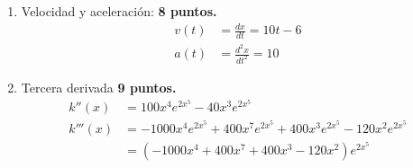 \documentclass{article}
\begin{document}
\begin{enumerate}
\item Velocidad y aceleración:
\hfill \textbf{8 puntos.}
\begin{align*}
v(t) &= \frac{dx}{dt} = 10t -6 \\
a(t) &= \frac{d^2x}{dt^2} = 10
\end{align*}

\item Tercera derivada
\hfill \textbf{9 puntos.}
\begin{align*}
k''(x)  &= 100x^{4} e^{2x^{5}} -40x^3 e^{2x^{5}} \\
k'''(x) &= -1000x^{4} e^{2x^{5}} + 400 x^{7} e^{2x^{5}} + 
            400x^{3} e^{2x^{5}} - 120 x^{2} e^{2x^{5}} \\
        &= (-1000x^{4} + 400 x^{7} + 400x^{3} - 120 x^{2}) e^{2x^{5}} \\
\end{align*}

\end{enumerate}
\end{document}
